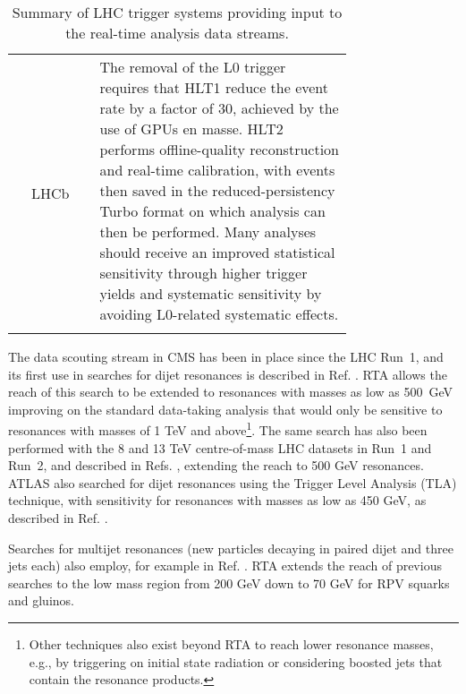 \begin{table}[h!]
\begin{tabular}{c|p{0.75\linewidth}}
        \multirow{3}{*}{\small{LHCb}}
            & \small{The removal of the L0 trigger requires that HLT1 reduce the event rate by a factor of 30, achieved by the use of GPUs en masse. HLT2 performs offline-quality reconstruction and real-time calibration, with events then saved in the reduced-persistency Turbo format on which analysis can then be performed. Many analyses should receive an improved statistical sensitivity through higher trigger yields and systematic sensitivity by avoiding L0-related systematic effects.} \\
        \thickhline
    \end{tabular}
    \caption{Summary of LHC trigger systems providing input to the real-time analysis data streams.}
    \label{trigger-table}
\end{table}



The data scouting stream in CMS has been in place since the LHC Run~1, and its first use in searches for dijet resonances is described in Ref. \cite{CMS-PAS-EXO-11-094}. RTA allows the reach of this search to be extended to resonances with masses as low as \SI{500}{\giga\electronvolt}
improving on the standard data-taking analysis that would only be sensitive to resonances with masses of 1 TeV and above\footnote{Other techniques also exist beyond RTA to reach lower resonance masses, e.g., by triggering on initial state radiation or considering boosted jets that contain the resonance products.}. The same search has also been performed with the 8 and 13 TeV centre-of-mass LHC datasets in Run~1 and Run~2, and described in Refs. \cite{CMS:2016ltu, CMS:2016gsl}, extending the reach to 500 GeV resonances. ATLAS also searched for dijet resonances using the Trigger Level Analysis (TLA) technique, with sensitivity for resonances with masses as low as 450 GeV, as described in Ref. \cite{ATLAS:2018qto}.


Searches for multijet resonances (new particles decaying in paired dijet and three jets each) also employ, for example in Ref. \cite{CMS-PAS-EXO-21-004}. RTA extends the reach of previous searches to the low mass region from 200 GeV down to 70 GeV for RPV squarks and gluinos. 

